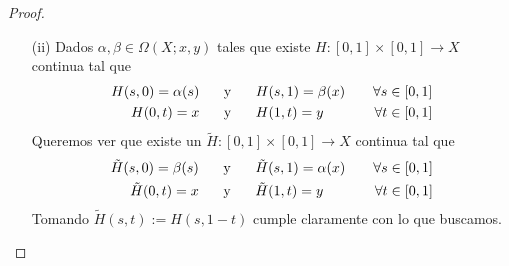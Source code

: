 \begin{lema}
\begin{proof}
\begin{enumerate}
            \item[(ii)] Dados $\alpha, \beta\in \Omega(X;x,y)$ tales que existe $H:[0,1]\times [0,1]\to X$ continua tal que 
            \begin{align*}
                H(s,0) = \alpha(s) \hspace{0.5cm} &\text{ y } \hspace{0.5cm} H(s,1) = \beta(x) \ \ \ &\forall s\in [0,1]\\
                H(0,t) = x  \hspace{0.5cm} &\text{ y } \hspace{0.5cm} H(1,t) = y \ \ \ &\forall t \in [0,1]
            \end{align*}
            Queremos ver que existe un $\tilde{H}:[0,1]\times[0,1]\to X$ continua tal que 
            \begin{align*}
                \tilde{H}(s,0) = \beta(s) \hspace{0.5cm} &\text{ y } \hspace{0.5cm} \tilde{H}(s,1) = \alpha(x) \ \ \ &\forall s\in [0,1]\\
                \tilde{H}(0,t) = x  \hspace{0.5cm} &\text{ y } \hspace{0.5cm} \tilde{H}(1,t) = y \ \ \ &\forall t \in [0,1]
            \end{align*}
            Tomando $\tilde{H}(s,t):=H(s, 1-t)$ cumple claramente con lo que buscamos.


\end{enumerate}
\end{proof}
\end{lema}
